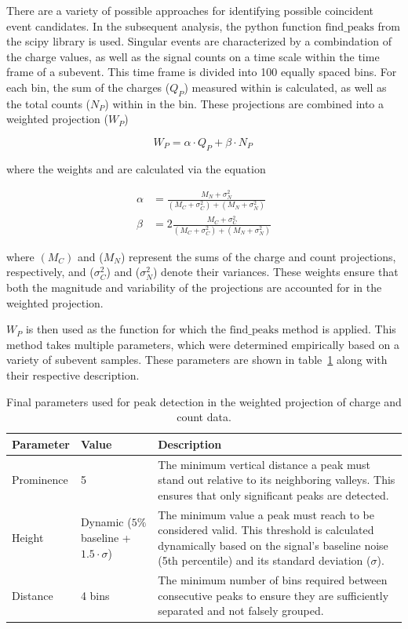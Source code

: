 There are a variety of possible approaches for identifying possible coincident event candidates. In the subsequent analysis, the python function $\text{find\_peaks}$ 
from 
the scipy library is used. Singular events are characterized by a combindation of the charge values, as well as the signal counts on a time scale within the time 
frame of a subevent. This time frame is divided into \num{100} equally spaced bins. For each bin, the sum of the charges ($Q_P$) measured within is calculated, 
as well as the total counts ($N_P$) within in the bin. These projections are combined into a weighted projection ($W_P$)

\begin{equation}
    W_P = \alpha\cdot Q_P +  \beta\cdot N_P\,
\end{equation}

where the weights \alpha and \beta are calculated via the equation

\begin{align}
    \alpha &= \frac{M_N + \sigma_N^2}{(M_C + \sigma_C^2) + (M_N + \sigma_N^2)} \\
    \beta &= 2\frac{M_C + \sigma_C^2}{(M_C + \sigma_C^2) + (M_N + \sigma_N^2)}
\end{align}


where $(M_C)$ and ($M_N$) represent the sums of the charge and count projections, respectively, and ($\sigma_C^2$) and ($\sigma_N^2$) denote their variances. 
These weights ensure that both the magnitude and variability of the projections are accounted for in the weighted projection. 

$W_P$ is then used as the function for which the $\text{find\_peaks}$ method is applied. This method takes multiple parameters, which were determined empirically 
based on a variety of subevent samples. These parameters are shown in table~\ref{tab:peak_parameters} along with their respective description.


\begin{table}[h!]
    \centering
    \begin{tabular}{|l|l|p{7cm}|}
    \hline
    \textbf{Parameter} & \textbf{Value} & \textbf{Description} \\ \hline
    Prominence & 5 & The minimum vertical distance a peak must stand out relative to its neighboring valleys. This ensures that only significant peaks are detected. \\ \hline
    Height & Dynamic (\(5\%\) baseline + \(1.5 \cdot \sigma\)) & The minimum value a peak must reach to be considered valid. This threshold is calculated dynamically based on the signal's baseline noise (5th percentile) and its standard deviation (\(\sigma\)). \\ \hline
    Distance & 4 bins & The minimum number of bins required between consecutive peaks to ensure they are sufficiently separated and not falsely grouped. \\ \hline
    \end{tabular}
    \caption{Final parameters used for peak detection in the weighted projection of charge and count data.}
    \label{tab:peak_parameters}
\end{table}


